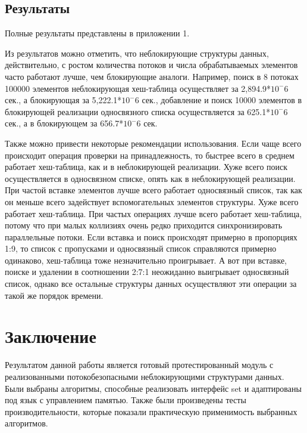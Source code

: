 \documentclass[12pt]{article}
\begin{document}
{				\subsection{Результаты}
					\par Полные результаты представлены в приложении 1.
					\par Из результатов можно отметить, что неблокирующие структуры данных, действительно, с ростом количества потоков и числа обрабатываемых элементов часто работают лучше, чем блокирующие аналоги. Например, поиск в 8 потоках 100000 элементов неблокирующая хеш-таблица осуществляет за 2,894.9*$10^-6$ сек., а блокирующая за 5,222.1*$10^-6$ сек., добавление и поиск 10000 элементов в блокирующей реализации односвязного списка осуществляется за 625.1*$10^-6$ сек., а в блокирующем за 656.7*$10^-6$ сек.
					\par Также можно привести некоторые рекомендации использования. Если чаще всего происходит операция проверки на принадлежность, то быстрее всего в среднем работает хеш-таблица, как и в неблокирующей реализации. Хуже всего поиск осуществляется в односвязном списке, опять как в неблокирующей реализации. При частой вставке элементов лучше всего работает односвязный список, так как он меньше всего задействует вспомогательных элементов структуры. Хуже всего работает хеш-таблица. При частых операциях лучше всего работает хеш-таблица, потому что при малых коллизиях очень редко приходится синхронизировать параллельные потоки. Если вставка и поиск происходят примерно в пропорциях 1:9, то список с пропусками и односвязный список справляются примерно одинаково, хеш-таблица тоже незначительно проигрывает. А вот при вставке, поиске и удалении в соотношении 2:7:1 неожиданно выигрывает односвязный список, однако все остальные структуры данных осуществляют эти операции за такой же порядок времени.				
				
		\newpage
		
		\section{Заключение}
			\par Результатом данной работы является готовый протестированный модуль с реализованными потокобезопасными неблокирующими структурами данных. Были выбраны алгоритмы, способные реализовать интерфейс set и адаптированы под язык с управлением памятью. Также были произведены тесты производительности, которые показали практическую применимость выбранных алгоритмов.
		
}
\end{document}
